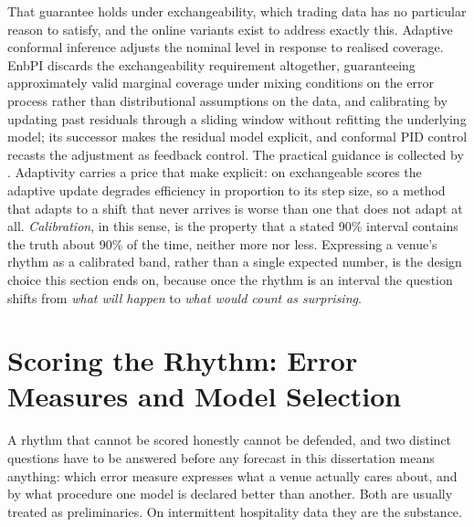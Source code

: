 That guarantee holds under exchangeability, which trading data has no
particular reason to satisfy, and the online variants exist to address exactly
this. Adaptive conformal inference \citep{gibbs_adaptive_2021} adjusts the
nominal level in response to realised coverage. EnbPI \citep{xu_conformal_2021}
discards the exchangeability requirement altogether, guaranteeing approximately
valid marginal coverage under mixing conditions on the error process rather
than distributional assumptions on the data, and calibrating by updating past
residuals through a sliding window without refitting the underlying model; its
successor \citep{xu_sequential_2023} makes the residual model explicit, and
conformal PID control \citep{angelopoulos_conformal_2023-1} recasts the
adjustment as feedback control. The practical guidance is collected by
\citet[a 2025 preprint]{stocker_gentle_2025}. Adaptivity carries a price that
\citet{zaffran_adaptive_2022} make explicit: on exchangeable scores the
adaptive update degrades efficiency in proportion to its step size, so a
method that adapts to a shift that never arrives is worse than one that does
not adapt at all. \emph{Calibration}, in this sense, is the property that a
stated 90\% interval contains the truth about 90\% of the time, neither more
nor less. Expressing a venue's rhythm as a calibrated band, rather than a
single expected number, is the design choice this section ends on, because once
the rhythm is an interval the question shifts from \emph{what will happen} to
\emph{what would count as surprising}.

\section{Scoring the Rhythm: Error Measures and Model Selection}
\label{sec:rw-ruler}

A rhythm that cannot be scored honestly cannot be defended, and two distinct
questions have to be answered before any forecast in this dissertation means
anything: which error measure expresses what a venue actually cares about, and
by what procedure one model is declared better than another. Both are usually
treated as preliminaries. On intermittent hospitality data they are the
substance.


